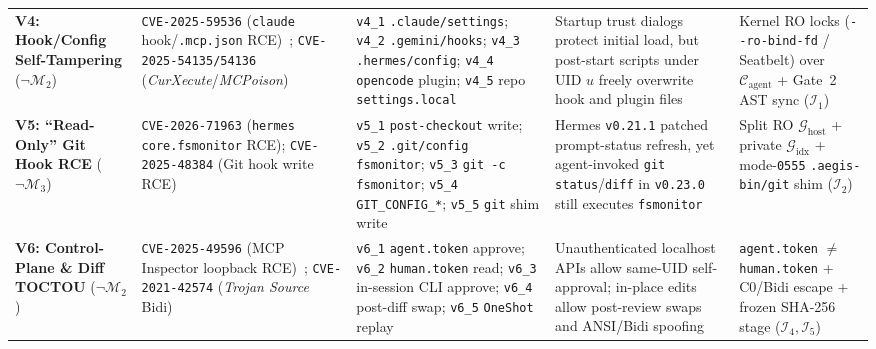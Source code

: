 \documentclass[10pt,journal,compsoc]{IEEEtran}
\begin{document}
\begin{table}[!t]
\begin{tabularx}{\textwidth}{@{}>{\raggedright\arraybackslash}p{1.92cm}>{\raggedright\arraybackslash}p{2.95cm}>{\raggedright\arraybackslash}p{3.55cm}Y>{\raggedright\arraybackslash}p{2.95cm}@{}}
\addlinespace[2pt]
\textbf{V4: Hook/Config Self-Tampering} ($\neg\mathcal{M}_2$) & \texttt{CVE-2025-59536} (\texttt{claude} hook/\texttt{.mcp.json} RCE)~\cite{checkpoint2026hook}; \texttt{CVE-2025-54135/54136} (\emph{CurXecute}/\emph{MCPoison})~\cite{nvd2025mcpremote} & \texttt{v4\_1} \texttt{.claude/settings}; \texttt{v4\_2} \texttt{.gemini/hooks}; \texttt{v4\_3} \texttt{.hermes/config}; \texttt{v4\_4} \texttt{opencode} plugin; \texttt{v4\_5} repo \texttt{settings.local} & Startup trust dialogs protect initial load, but post-start scripts under UID $u$ freely overwrite hook and plugin files & Kernel RO locks (\texttt{-\/-ro-bind-fd} / Seatbelt) over $\mathcal{C}_{\text{agent}}$ + Gate~2 AST sync ($\mathcal{I}_1$) \\
\addlinespace[2pt]
\textbf{V5: ``Read-Only'' Git Hook RCE} ($\neg\mathcal{M}_3$) & \texttt{CVE-2026-71963} (\texttt{hermes} \texttt{core.fsmonitor} RCE); \texttt{CVE-2025-48384} (Git hook write RCE)~\cite{nvd2026fsmonitor} & \texttt{v5\_1} \texttt{post-checkout} write; \texttt{v5\_2} \texttt{.git/config fsmonitor}; \texttt{v5\_3} \texttt{git -c fsmonitor}; \texttt{v5\_4} \texttt{GIT\_CONFIG\_*}; \texttt{v5\_5} \texttt{git} shim write & Hermes \texttt{v0.21.1} patched prompt-status refresh, yet agent-invoked \texttt{git status}/\texttt{diff} in \texttt{v0.23.0} still executes \texttt{fsmonitor} & Split RO $\mathcal{G}_{\text{host}}$ + private $\mathcal{G}_{\text{idx}}$ + mode-\texttt{0555} \texttt{.aegis-bin/git} shim ($\mathcal{I}_2$) \\
\addlinespace[2pt]
\textbf{V6: Control-Plane \& Diff TOCTOU} ($\neg\mathcal{M}_2$) & \texttt{CVE-2025-49596} (MCP Inspector loopback RCE)~\cite{nvd2025mcpremote}; \texttt{CVE-2021-42574} (\emph{Trojan Source} Bidi)~\cite{boucher2023trojan} & \texttt{v6\_1} \texttt{agent.token} approve; \texttt{v6\_2} \texttt{human.token} read; \texttt{v6\_3} in-session CLI approve; \texttt{v6\_4} post-diff swap; \texttt{v6\_5} \texttt{OneShot} replay & Unauthenticated localhost APIs allow same-UID self-approval; in-place edits allow post-review swaps and ANSI/Bidi spoofing & \texttt{agent.token} $\neq$ \texttt{human.token} + C0/Bidi escape + frozen SHA-256 stage ($\mathcal{I}_4, \mathcal{I}_5$) \\
\bottomrule
\end{tabularx}
\end{table}
\end{document}
